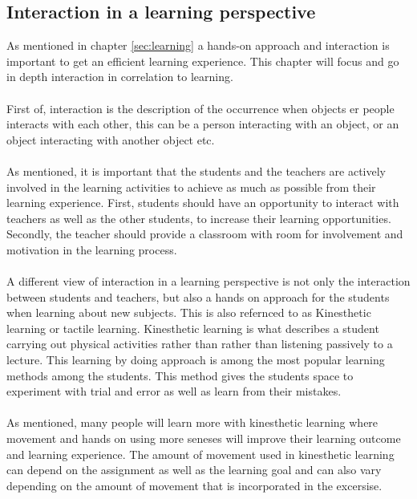 \subsection{Interaction in a learning perspective}\label{sec:interaction}
As mentioned in chapter \ref{sec:learning} a hands-on approach and interaction is important to get an efficient learning experience. This chapter will focus and go in depth interaction in correlation to learning.\\
\\
First of, interaction is the description of the occurrence when objects er people interacts with each other, this can be a person interacting with an object, or an object interacting with another object etc.\\
\\
As mentioned, it is important that the students and the teachers are actively involved in the learning activities to achieve as much as possible from their learning experience. First, students should have an opportunity to interact with teachers as well as the other students, to increase their learning opportunities. Secondly, the teacher should provide a classroom with room for involvement and motivation in the learning process\cite{interactionlearning}.\\
\\
A different view of interaction in a learning perspective is not only the interaction between students and teachers, but also a hands on approach for the students when learning about new subjects. This is also refernced to as Kinesthetic learning or tactile learning. Kinesthetic learning is what describes a student carrying out physical activities rather than rather than listening passively to a lecture. This learning by doing approach is among the most popular learning methods among the students. This method gives the students space to experiment with trial and error as well as learn from their mistakes.\cite{kinest} \\
\\
As mentioned, many people will learn more with kinesthetic learning where movement and hands on using more seneses will improve their learning outcome and learning experience. The amount of movement used in kinesthetic learning can depend on the assignment as well as the learning goal and can also vary depending on the amount of movement that is incorporated in the excersise.\\

